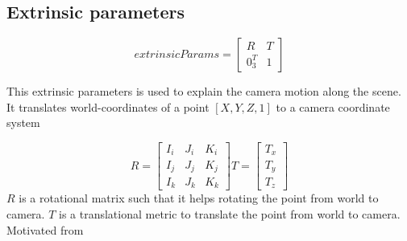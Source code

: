 \documentclass[a4paper, twoside, english]{article}
\begin{document}
\subsection{Extrinsic parameters}
\begin{equation*} extrinsicParams = 
\begin{bmatrix}
R & T \\
0_3^T & 1
\end{bmatrix}
\end{equation*}

This extrinsic parameters is used to explain the camera motion along the scene. It translates world-coordinates of a point $[X,Y,Z,1]$ to a camera coordinate system

\begin{equation*} R = 
\begin{bmatrix}
I_i & J_i & K_i \\
I_j & J_j & K_j \\
I_k & J_k & K_k 
\end{bmatrix}
T=
\begin{bmatrix}
T_x \\
T_y \\
T_z
\end{bmatrix}
\end{equation*}
$R$ is a rotational matrix such that it helps rotating the point from world to camera.
$T$ is a translational metric to translate the point from world to camera.
Motivated from \cite{SomeLinearAlgebra}



\end{document}
